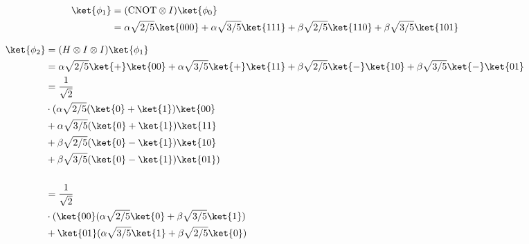\documentclass{article}
\newcommand{\CNOT}{{\rm CNOT}}
\begin{document}
\begin{enumerate}
        $$\begin{aligned}
            \ket{\phi_1} & =(\CNOT\otimes I)\ket{\phi_0}                                                                          \\
                         & =\alpha\sqrt{2/5}\ket{000}+\alpha\sqrt{3/5}\ket{111}+\beta\sqrt{2/5}\ket{110}+\beta\sqrt{3/5}\ket{101} \\
          \end{aligned}$$

        $$\begin{aligned}
            \ket{\phi_2} & =(H\otimes I\otimes I)\ket{\phi_1}                                                                                             \\
                         & =\alpha\sqrt{2/5}\ket{+}\ket{00}+\alpha\sqrt{3/5}\ket{+}\ket{11}+\beta\sqrt{2/5}\ket{-}\ket{10}+\beta\sqrt{3/5}\ket{-}\ket{01} \\
                         & =\frac{1}{\sqrt{2}}                                                                                                            \\
                         & \cdot(\alpha\sqrt{2/5}(\ket{0}+\ket{1})\ket{00}                                                                                \\
                         & +\alpha\sqrt{3/5}(\ket{0}+\ket{1})\ket{11}                                                                                     \\
                         & +\beta\sqrt{2/5}(\ket{0}-\ket{1})\ket{10}                                                                                      \\
                         & +\beta\sqrt{3/5}(\ket{0}-\ket{1})\ket{01})                                                                                     \\                                                                                                \\
                         & =\frac{1}{\sqrt{2}}                                                                                                            \\
                         & \cdot(\ket{00}(\alpha\sqrt{2/5}\ket{0}+\beta\sqrt{3/5}\ket{1})                                                                 \\
                         & +\ket{01}(\alpha\sqrt{3/5}\ket{1}+\beta\sqrt{2/5}\ket{0})                                                                      \\

\end{aligned}$$
\end{enumerate}
\end{document}
